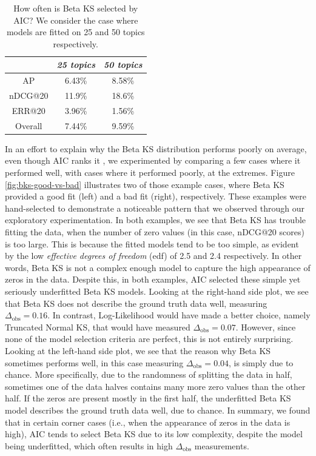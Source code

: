 \begin{table}[t]
	\centering
	\begin{tabular}{c c c} %
		\toprule
		& \textit{25 topics} & \textit{50 topics} \\
		\midrule
		AP          & 6.43\%  & 8.58\% \\ 
		nDCG@20     & 11.9\%  & 18.6\% \\
		ERR@20      & 3.96\%  & 1.56\% \\
		\midrule
		Overall     & 7.44\% & 9.59\% \\
		\bottomrule
	\end{tabular}
	\caption{How often is Beta KS selected by AIC? We consider the case where models are fitted on 25 and 50 topics respectively.}
	\label{tab:bks-freq}
\end{table}

In an effort to explain why the Beta KS distribution performs poorly on average, even though AIC ranks it , we experimented by comparing a few cases where it performed well, with cases where it performed poorly, at the extremes. Figure \ref{fig:bks-good-vs-bad} illustrates two of those example cases, where Beta KS provided a good fit (left) and a bad fit (right), respectively. These examples were hand-selected to demonstrate a noticeable pattern that we observed through our exploratory experimentation. In both examples, we see that Beta KS has trouble fitting the data, when the number of zero values (in this case, nDCG@20 scores) is too large. This is because the fitted models tend to be too simple, as evident by the low \textit{effective degrees of freedom} (edf) of \num{2.5} and \num{2.4} respectively. In other words, Beta KS is not a complex enough model to capture the high appearance of zeros in the data. Despite this, in both examples, AIC selected these simple yet seriously underfitted Beta KS models. Looking at the right-hand side plot, we see that Beta KS does not describe the ground truth data well, measuring $\Delta_{\text{obs}}=0.16$. In contrast, Log-Likelihood would have made a better choice, namely Truncated Normal KS, that would have measured $\Delta_{\text{obs}}=0.07$. However, since none of the model selection criteria are perfect, this is not entirely surprising. Looking at the left-hand side plot, we see that the reason why Beta KS sometimes performs well, in this case measuring $\Delta_{\text{obs}}=0.04$, is simply due to chance. More specifically, due to the randomness of splitting the data in half, sometimes one of the data halves contains many more zero values than the other half. If the zeros are present mostly in the first half, the underfitted Beta KS model describes the ground truth data well, due to chance. In summary, we found that in certain corner cases (i.e., when the appearance of zeros in the data is high), AIC tends to select Beta KS due to its low complexity, despite the model being underfitted, which often results in high $\Delta_{\text{obs}}$ measurements.

